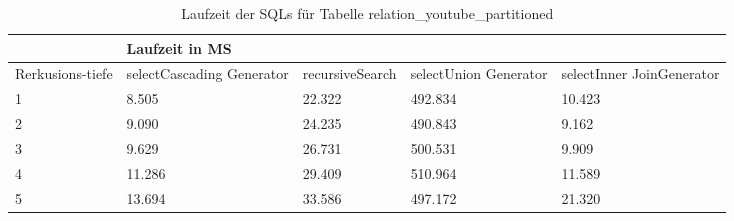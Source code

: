 \begin{table}[H]
	\centering
	\begin{tabular}{l|l|l|l|l|l|}
		\cline{2-6}
		& \multicolumn{5}{|l|}{Laufzeit in MS}                                                                                                                                                  \\ \hline
		\multicolumn{1}{|l|}{\multirow{2}{2cm}{Rerkusions-tiefe}} & \multicolumn{2}{|l|}{\multirow{2}{3cm}{selectCascading Generator}} & \multirow{2}{2.8cm}{recursiveSearch} & \multirow{2}{2.5cm}{selectUnion Generator} & \multirow{2}{2.5cm}{selectInner JoinGenerator} \\
		\multicolumn{1}{|l|}{}
		& \multicolumn{2}{|l|}{}                                           &                                  &                                     &                                           \\ \hline
		
		\multicolumn{1}{|l|}{1}                                 & \multicolumn{2}{l|}{8.505}                                       & 22.322                                                & 492.834                                                   & 10.423                                                          \\ \hline
		\multicolumn{1}{|l|}{2}                                 & \multicolumn{2}{l|}{9.090}                                       & 24.235                                                & 490.843                                                   & 9.162                                                           \\ \hline
		\multicolumn{1}{|l|}{3}                                 & \multicolumn{2}{l|}{9.629}                                       & 26.731                                                & 500.531                                                   & 9.909                                                           \\ \hline
		\multicolumn{1}{|l|}{4}                                 & \multicolumn{2}{l|}{11.286}                                      & 29.409                                                & 510.964                                                   & 11.589                                                          \\ \hline
		\multicolumn{1}{|l|}{5}                                 & \multicolumn{2}{l|}{13.694}                                      & 33.586                                                & 497.172                                                   & 21.320                                                          \\ \hline
		
	\end{tabular}
	\caption{Laufzeit der SQLs für Tabelle relation\_youtube\_partitioned}
	\label{2.youtubepartion.table}
\end{table}

